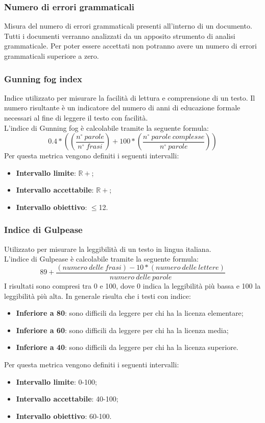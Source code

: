 \subsubsection{Numero di errori grammaticali}
Misura del numero di errori grammaticali presenti all'interno di un documento.
Tutti i documenti verranno analizzati da un apposito strumento di analisi grammaticale. Per poter essere accettati non potranno avere un numero di errori grammaticali superiore a zero.

\subsubsection{Gunning fog index}
Indice utilizzato per misurare la facilità di lettura e comprensione di un testo. Il numero risultante è un indicatore del numero di anni di educazione formale necessari al fine di leggere il testo con facilità. \\
L'indice di Gunning fog è calcolabile tramite la seguente formula:
$$
	0.4*((\frac{n^{\circ}\:parole}{n^{\circ}\:frasi})+100*(\frac{n^{\circ}\:parole\:complesse}{n^{\circ}\:parole}))
$$
Per questa metrica vengono definiti i seguenti intervalli: 
\begin{itemize}
	\item{\textbf{Intervallo limite}: $\mathbb{R+}$;}
	\item{\textbf{Intervallo accettabile}: $\mathbb{R+}$;}
	\item{\textbf{Intervallo obiettivo}: $\leq$12.}
\end{itemize}
\subsubsection{Indice di Gulpease}
Utilizzato per misurare la leggibilità di un testo in lingua italiana.\\
L'indice di Gulpease è calcolabile tramite la seguente formula:
$$
	89+\frac{(numero\:delle\:frasi)-10*(numero\:delle\:lettere)}{numero\:delle\:parole}
$$
I risultati sono compresi tra 0 e 100, dove 0 indica la leggibilità più bassa e 100 la leggibilità più alta. In generale risulta che i testi con indice:
	\begin{itemize}
		\item{\textbf{Inferiore	a 80}}: sono difficili da leggere per chi ha la licenza elementare;
		\item{\textbf{Inferiore	a 60}}: sono difficili da leggere per chi ha la licenza media;
		\item{\textbf{Inferiore	a 40}}: sono difficili da leggere per chi ha la licenza superiore.
	\end{itemize}
Per questa metrica vengono definiti i seguenti intervalli: 
	\begin{itemize}
		\item{\textbf{Intervallo limite}: 0-100;}
		\item{\textbf{Intervallo accettabile}: 40-100;}
		\item{\textbf{Intervallo obiettivo}: 60-100.}
	\end{itemize}

